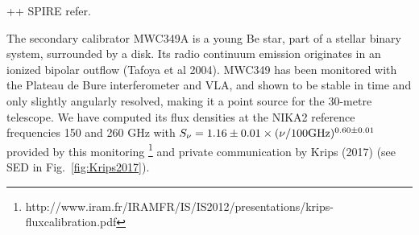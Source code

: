 


%

\label{se:fluxSec}

++ SPIRE refer.

The secondary calibrator MWC349A is a young Be star, part of a stellar binary system, surrounded by a disk. Its radio
continuum emission originates in an ionized bipolar outflow (Tafoya et al 2004).
MWC349 has been monitored with the  Plateau de Bure interferometer and VLA,
and shown to be stable in time and only slightly angularly resolved, making it a point source
for the 30-metre telescope. We have computed its flux densities at the NIKA2 reference frequencies 150 and 260 GHz with 
$S_\nu = 1.16\pm0.01 \times (\nu/100 \rm{GHz})^{0.60\pm0.01}$ provided by this monitoring
\footnote{http://www.iram.fr/IRAMFR/IS/IS2012/presentations/krips-fluxcalibration.pdf} and
 private communication by Krips (2017) (see SED in Fig.~\ref{fig:Krips2017}).

